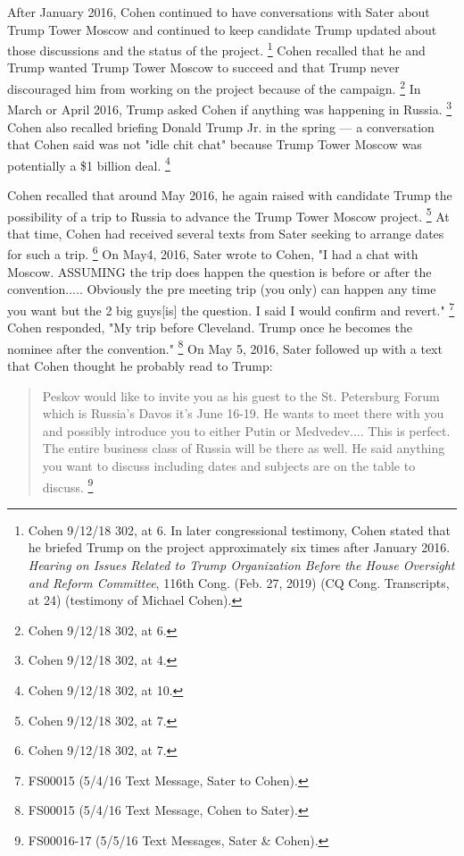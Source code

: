 {After January 2016, Cohen continued to have conversations with Sater about Trump Tower Moscow and continued to keep candidate Trump updated about those discussions and the status of the project.%
\footnote{Cohen 9/12/18 302, at 6.
In later congressional testimony, Cohen stated that he briefed Trump on the project approximately six times after January 2016.
\textit{Hearing on Issues Related to Trump Organization Before the House Oversight and Reform Committee}, 116th Cong.
(Feb. 27, 2019) (CQ Cong. Transcripts, at 24) (testimony of Michael Cohen).}
Cohen recalled that he and Trump wanted Trump Tower Moscow to succeed and that Trump never discouraged him from working on the project because of the campaign.%
\footnote{Cohen 9/12/18 302, at 6.}
In March or April 2016, Trump asked Cohen if anything was happening in Russia.%
\footnote{Cohen 9/12/18 302, at 4.}
Cohen also recalled briefing Donald Trump Jr. in the spring — a conversation that Cohen said was not "idle chit chat" because Trump Tower Moscow was potentially a \$1 billion deal.%
\footnote{Cohen 9/12/18 302, at 10.}

Cohen recalled that around May 2016, he again raised with candidate Trump the possibility of a trip to Russia to advance the Trump Tower Moscow project.%
\footnote{Cohen 9/12/18 302, at 7.}
At that time, Cohen had received several texts from Sater seeking to arrange dates for such a trip.%
\footnote{Cohen 9/12/18 302, at 7.}
On May4, 2016, Sater wrote to Cohen, "I had a chat with Moscow.
ASSUMING the trip does happen the question is before or after the convention.....
Obviously the pre meeting trip (you only) can happen any time you want but the 2 big guys[is] the question.
I said I would confirm and revert."%
\footnote{FS00015 (5/4/16 Text Message, Sater to Cohen).}
Cohen responded, "My trip before Cleveland.
Trump once he becomes the nominee after the convention."%
\footnote{FS00015 (5/4/16 Text Message, Cohen to Sater).}
On May 5, 2016, Sater followed up with a text that Cohen thought he probably read to Trump:

\begin{quote}
Peskov would like to invite you as his guest to the St. Petersburg Forum which is Russia's Davos it's June 16-19.
He wants to meet there with you and possibly introduce you to either Putin or Medvedev....
This is perfect.
The entire business class of Russia will be there as well.
He said anything you want to discuss including dates and subjects are on the table to discuss.%
\footnote{FS00016-17 (5/5/16 Text Messages, Sater \& Cohen).}
\end{quote}

}
